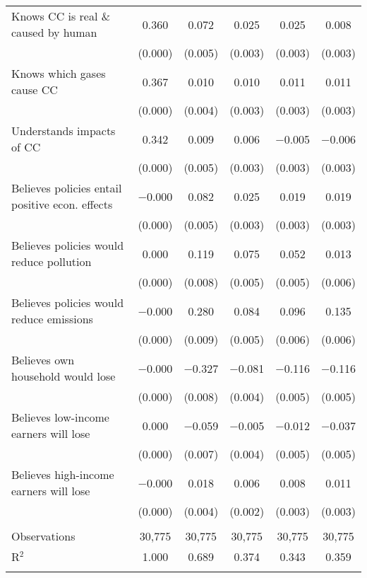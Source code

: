\begin{tabular}{@{\extracolsep{5pt}}lccccc}
  Knows CC is real \& caused by human & 0.360 & 0.072 & 0.025 & 0.025 & 0.008 \\ 
  & (0.000) & (0.005) & (0.003) & (0.003) & (0.003) \\ 
  Knows which gases cause CC & 0.367 & 0.010 & 0.010 & 0.011 & 0.011 \\ 
  & (0.000) & (0.004) & (0.003) & (0.003) & (0.003) \\ 
  Understands impacts of CC & 0.342 & 0.009 & 0.006 & $-$0.005 & $-$0.006 \\ 
  & (0.000) & (0.005) & (0.003) & (0.003) & (0.003) \\ 
  Believes policies entail positive econ. effects & $-$0.000 & 0.082 & 0.025 & 0.019 & 0.019 \\ 
  & (0.000) & (0.005) & (0.003) & (0.003) & (0.003) \\ 
  Believes policies would reduce pollution & 0.000 & 0.119 & 0.075 & 0.052 & 0.013 \\ 
  & (0.000) & (0.008) & (0.005) & (0.005) & (0.006) \\ 
  Believes policies would reduce emissions & $-$0.000 & 0.280 & 0.084 & 0.096 & 0.135 \\ 
  & (0.000) & (0.009) & (0.005) & (0.006) & (0.006) \\ 
  Believes own household would lose & $-$0.000 & $-$0.327 & $-$0.081 & $-$0.116 & $-$0.116 \\ 
  & (0.000) & (0.008) & (0.004) & (0.005) & (0.005) \\ 
  Believes low-income earners will lose & 0.000 & $-$0.059 & $-$0.005 & $-$0.012 & $-$0.037 \\ 
  & (0.000) & (0.007) & (0.004) & (0.005) & (0.005) \\ 
  Believes high-income earners will lose & $-$0.000 & 0.018 & 0.006 & 0.008 & 0.011 \\ 
  & (0.000) & (0.004) & (0.002) & (0.003) & (0.003) \\ 
 \hline \\[-1.8ex] 

Observations & 30,775 & 30,775 & 30,775 & 30,775 & 30,775 \\ 
R$^{2}$ & 1.000 & 0.689 & 0.374 & 0.343 & 0.359 \\ 
\hline 
\hline \\[-1.8ex] 
\end{tabular} 